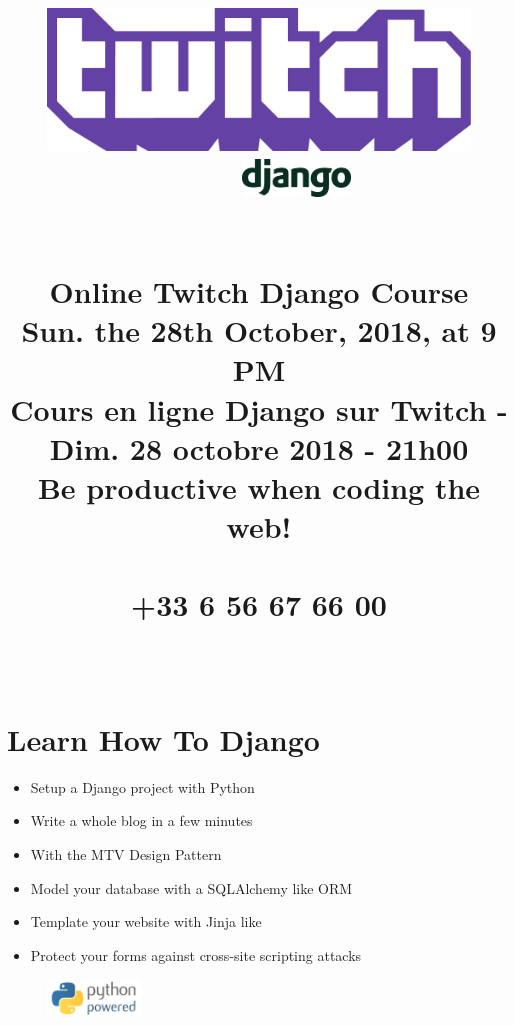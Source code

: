 \documentclass[final]{article}
\title{
    \begin{figure}[H]
        \centering
        \includegraphics[height=.9cm]{assets/Twitch_Purple_RGB.png}
        ~~~~
        \includegraphics[height=1cm]{assets/django-logo-positive.png}
    \end{figure}
	\horrule{0.5pt} \\ [0.4cm]
    \huge \textbf{ Online Twitch Django Course \\ [0.2cm] }
    \Large \textbf{ Sun. the 28th October, 2018, at 9 PM \\ [0.5cm] }
    \normalsize{Cours en ligne Django sur Twitch - Dim. 28 octobre 2018 - 21h00 \\ [1cm] }
    \Huge \textbf{Be productive when coding the web! \\ [1cm]}
	\horrule{2pt}
    \large {
        \email \\
        +33 6 56 67 66 00 \\ [0.2cm]
        \webpageUrl \\ [0.2cm]
        \fcolorbox{twitchCol}{white}{\parbox{
            \dimexpr 2.2in \fboxsep-2 \fboxrule}{
                {\textcolor{twitchCol}{\qrcode[height=2.25in]{\webpageUrl}}}
            }
        }
    }
}
\date{}
\author{}
\begin{document}
    \maketitle
    
    \Large
    
    \section*{\Huge{Learn How To Django}}
        \begin{itemize}
            \item Setup a Django project with Python
            \item Write a whole blog in a few minutes
            \item With the MTV Design Pattern
            \item Model your database with a SQLAlchemy like ORM
            \item Template your website with Jinja like
            \item Protect your forms against cross-site scripting attacks
        \end{itemize}
        
        \vspace*{\fill}
        
        \begin{figure}[H]
            \centering
            \includegraphics[height=1cm]{assets/python-powered-w-200x80.png}
    \end{figure}
\end{document}
